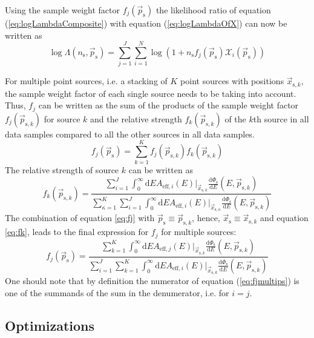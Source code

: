 \documentclass{article}
\newcommand{\eq}[1]{(\ref{#1})}
\newcommand{\ns}{n_{\mathrm{s}}}
\newcommand{\ps}{\vec{p}_{\mathrm{s}}}
\newcommand{\xs}{\vec{x}_{\mathrm{s}}}
\newcommand{\dPhisdE}{\frac{\mathrm{d}\Phi_{\mathrm{s}}}{\mathrm{d}E}}
\begin{document}
Using the sample weight factor $f_{j}(\ps)$ the likelihood ratio of
equation \eq{eq:logLambdaComposite} with equation \eq{eq:logLambdaOfX} can now
be written as
\begin{equation}
 \log \Lambda(\ns,\ps) = \sum_{j=1}^{J} \sum_{i=1}^{N} \log (1 + \ns f_{j}(\ps)\mathcal{X}_i(\ps))
\end{equation}


For multiple point sources, i.e. a stacking of $K$ point sources with positions
$\vec{x}_{\mathrm{s},k}$, the sample weight factor of each single source needs
to be taking into account. Thus, $f_{j}$ can be written as the sum of the
products of the sample weight factor $f_{j}(\vec{p}_{\mathrm{s},k})$ for
source $k$ and the relative strength $f_{k}(\vec{p}_{\mathrm{s},k})$ of the
$k$th source in all data samples compared to all the other sources in all data
samples.
\begin{equation}
 f_{j}(\ps) = \sum_{k=1}^{K} f_{j}(\vec{p}_{\mathrm{s},k}) f_{k}(\vec{p}_{\mathrm{s},k})
\end{equation}
The relative strength of source $k$ can be written as
\begin{equation}
 f_{k}(\vec{p}_{\mathrm{s},k}) =
    \frac{\sum_{i=1}^{J} \int_0^\infty \mathrm{d}E A_{\mathrm{eff},i}(E)|_{\vec{x}_{\mathrm{s},k}} \dPhisdE(E,\vec{p}_{\mathrm{s},k})}
         {\sum_{\kappa=1}^{K} \sum_{i=1}^{J} \int_0^\infty \mathrm{d}E A_{\mathrm{eff},i}(E)|_{\vec{x}_{\mathrm{s},\kappa}} \dPhisdE(E,\vec{p}_{\mathrm{s},k}) }
 \label{eq:fk}
\end{equation}
The combination of equation \ref{eq:fj} with $\ps \equiv \vec{p}_{\mathrm{s},k}$, hence,
$\xs \equiv \vec{x}_{\mathrm{s},k}$ and equation
\ref{eq:fk}, leads to the final expression for $f_{j}$ for multiple sources:
\begin{equation}
 f_{j}(\ps) =
    \frac{\sum_{k=1}^{K} \int_0^\infty \mathrm{d}E A_{\mathrm{eff},j}(E)|_{\vec{x}_{\mathrm{s},k}} \dPhisdE(E,\vec{p}_{\mathrm{s},k}) }
         {\sum_{i=1}^{J} \sum_{k=1}^{K} \int_0^\infty \mathrm{d}E A_{\mathrm{eff},i}(E)|_{\vec{x}_{\mathrm{s},k}} \dPhisdE(E,\vec{p}_{\mathrm{s},k}) }
 \label{eq:fjmultips}
\end{equation}
One should note that by definition the numerator of equation \eq{eq:fjmultips}
is one of the summands of the sum in the denumerator, i.e. for $i=j$.

\subsection{Optimizations}
\end{document}
